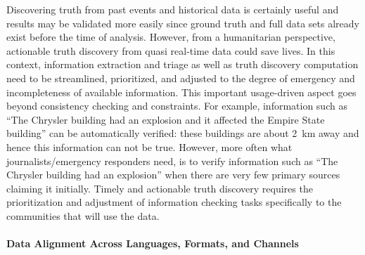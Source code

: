 \documentclass[prodmode,acmtecs]{acmsmall} %
\begin{document}
Discovering truth from past events and historical data is certainly useful and results may be validated more easily since ground truth and full data sets already exist before the time of analysis. However, from a humanitarian perspective, actionable truth discovery from quasi real-time data could save lives. %
In this context, information extraction and triage as well as truth discovery computation need to be streamlined, prioritized,  and adjusted to the degree of emergency and incompleteness of available information. This important usage-driven aspect goes beyond consistency checking and constraints. For example, information such as ``The Chrysler building had an explosion and it affected the Empire State building'' can be automatically verified: these buildings are about 2~km away and hence this information can not be true. However, more often what journalists/emergency responders need, is to verify information such as ``The Chrysler building had an explosion'' when there are very few primary sources claiming it initially. Timely and actionable truth discovery requires the prioritization and adjustment of information checking tasks specifically to the communities that will use the data.
%

\paragraph*{Data Alignment Across Languages, Formats, and Channels} 
\end{document}
